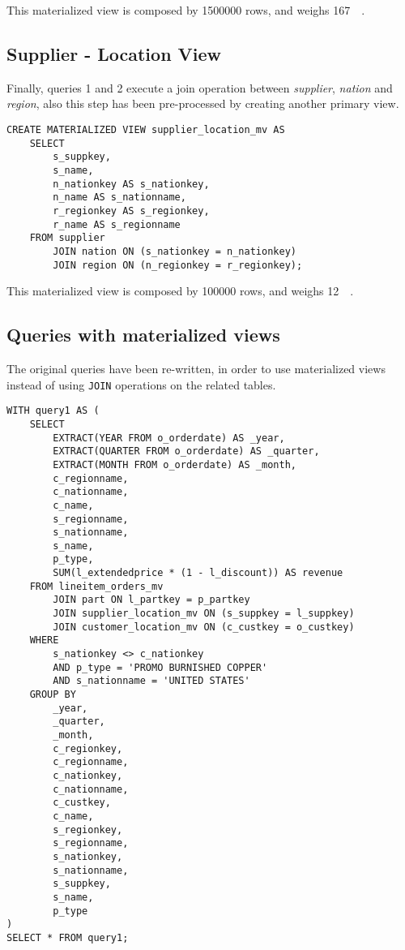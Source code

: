 This materialized view is composed by \num{1500000} rows, and weighs \SI{167}{\mega\byte}.

\subsection{Supplier - Location View}
Finally, queries 1 and 2 execute a join operation between \textit{supplier}, \textit{nation} and \textit{region}, also this step has been pre-processed by creating another primary view.

\begin{lstlisting}
CREATE MATERIALIZED VIEW supplier_location_mv AS
	SELECT 
		s_suppkey, 
		s_name, 
		n_nationkey AS s_nationkey, 
		n_name AS s_nationname, 
		r_regionkey AS s_regionkey, 
		r_name AS s_regionname 
	FROM supplier 
		JOIN nation ON (s_nationkey = n_nationkey)
		JOIN region ON (n_regionkey = r_regionkey);
\end{lstlisting}

This materialized view is composed by \num{100000} rows, and weighs \SI{12}{\mega\byte}.

\subsection{Queries with materialized views}
\label{subsection:queriesmaterilizedviews}

The original queries have been re-written, in order to use materialized views instead of using \texttt{JOIN} operations on the related tables.

\begin{lstlisting}
WITH query1 AS (
	SELECT
		EXTRACT(YEAR FROM o_orderdate) AS _year,
		EXTRACT(QUARTER FROM o_orderdate) AS _quarter,
		EXTRACT(MONTH FROM o_orderdate) AS _month,
		c_regionname,
		c_nationname,
		c_name,
		s_regionname,
		s_nationname,
		s_name,
		p_type,
		SUM(l_extendedprice * (1 - l_discount)) AS revenue
	FROM lineitem_orders_mv 
		JOIN part ON l_partkey = p_partkey
		JOIN supplier_location_mv ON (s_suppkey = l_suppkey)
		JOIN customer_location_mv ON (c_custkey = o_custkey)
	WHERE
		s_nationkey <> c_nationkey
		AND p_type = 'PROMO BURNISHED COPPER'
		AND s_nationname = 'UNITED STATES'
	GROUP BY
		_year,
		_quarter,
		_month,
		c_regionkey,
		c_regionname,
		c_nationkey,
		c_nationname,
		c_custkey,
		c_name,
		s_regionkey,
		s_regionname,
		s_nationkey,
		s_nationname,
		s_suppkey,
		s_name,
		p_type
)
SELECT * FROM query1;
\end{lstlisting}

